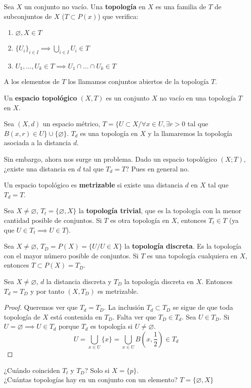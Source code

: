 \begin{ndef}[Topología]
  Sea $X$ un conjunto no vacío. Una \textbf{topología} en $X$ es una familia de $T$ de subconjuntos de $X$ ($T \subset P(x)$) que verifica:
  \begin{enumerate}
    \item $\varnothing ,X \in T$
    \item $\{U_i\}_{i \in I} \implies \bigcup_{i \in I} U_i \in T$
    \item $U_1,\ldots,U_k \in T \implies U_1 \cap \ldots \cap U_k \in T$
  \end{enumerate}
  A los elementos de $T$ los llamamos conjuntos abiertos de la topología $T$.
\end{ndef}
\begin{ndef}
  Un \textbf{espacio topológico} $(X,T)$ es un conjunto $X$ no vacío en una topología $T$ en $X$.
\end{ndef}
\begin{exmp}
  Sea $(X,d)$ un espacio métrico, $T=\{U \subset  X / \forall x \in U, \exists r>0$ tal que $B(x,r) \in U\} \cup \{\varnothing \}$. $T_d$ es una topología en $X$ y la llamaremos la topología asociada a la distancia $d$.
\end{exmp}
Sin embargo, ahora nos surge un problema. Dado un espacio topológico $(X;T)$, ¿existe una distancia en $d$ tal que $T_d=T$? Pues en general no.
\begin{ndef}
  Un espacio topológico es \textbf{metrizable} si existe una distancia $d$ en $X$ tal que $T_d=T$.
\end{ndef}
\begin{exmp}
  Sea $X \neq \varnothing $, $T_t=\{\varnothing ,X\}$ la \textbf{topología trivial}, que es la topología con la menor cantidad posible de conjuntos. Si $T$ es otra topología en $X$, entonces $T_t \in T$ (ya que $U \in T_t \implies U \in T$).
\end{exmp}
\begin{exmp}
  Sea $X \neq \varnothing $, $T_D = P(X) = \{U / U \in X\}$ la \textbf{topología discreta}. Es la topología con el mayor número posible de conjuntos. Si $T$ es una topología cualquiera en $X$, entonces $T \subset P(X)=T_D$.
\end{exmp}
\begin{properties}
  Sea $X \neq \varnothing $, $d$ la distancia discreta y $T_D$ la topología discreta en $X$. Entonces $T_d=T_D$ y por tanto $(X,T_D)$ es metrizable.
\end{properties}
\begin{proof}
  Queremos ver que $T_d = T_D$. La inclusión $T_d \subset T_D$ se sigue de que toda topología de $X$ está contenida en $T_D$. Falta ver que $T_D \in T_d$. Sea $U \in T_D$. Si $U=\varnothing \implies U \in T_d$ porque $T_d$ es topología si $U \neq \varnothing $. \[U = \bigcup_{x \in U} \{x\} = \bigcup_{x \in U} B(x,\frac{1}{2}) \in T_d \]
\end{proof}
¿Cuándo coinciden $T_t$ y $T_D$? Solo si $X=\{p\}$.\\
¿Cuántas topologías hay en un conjunto con un elemento? $T=\{\varnothing ,X\}$

